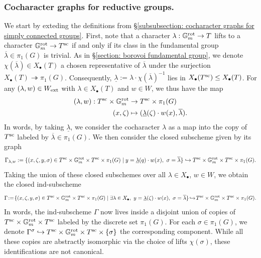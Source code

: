 \subsubsection{Cocharacter graphs for reductive groups.}\label{subsubsection: cocharacter graphs for reductive groups}
We start by exteding the definitions from \S \ref{subsubsection: cocharacter graphs for simply connected groups}.
First, note that a character $\lambda: \Gm^{\rot} \to T$ lifts to a character $\Gm^{\rot} \to T^{\sc}$ if and only if its class in the fundamental group $\overline{\lambda} \in \pi_1(G)$ is trivial. As in \S \ref{section: borovoi fundamental group}, we denote $\chi(\overline{\lambda}) \in X_{\bullet}(T)$ a chosen representative of $\overline{\lambda}$ under the surjection $X_{\bullet}(T) \twoheadrightarrow \pi_1(G)$. Consequently, $\underline{\lambda} := \lambda \cdot \chi(\overline{\lambda})^{-1}$ lies in $X_{\bullet}(T^{\sc}) \leq X_{\bullet}(T)$.
%
For any $(\lambda, w) \in W_{\ext}$ with $\lambda \in X_{\bullet}(T)$ and $w \in W$, we thus have the map
\begin{align*}
    (\lambda, w): T^{\sc} \times \Gm^{\rot} &\to T^{\sc} \times \pi_1(G) \\
    (x, \zeta) &\mapsto (\underline{\lambda}(\zeta) \cdot w(x), \overline{\lambda}).
\end{align*}
In words, by taking $\underline{\lambda}$, we consider the cocharacter $\lambda$ as a map into the copy of $T^{\sc}$ labeled by $\overline{\lambda} \in \pi_1(G)$. We then consider the closed subscheme given by its graph
\begin{equation*}
    \Gamma_{\lambda, w} := \{ (x, \zeta, y, \sigma) \in T^{\sc} \times \Gm^{\rot} \times T^{\sc} \times \pi_1(G) \mid y = \underline{\lambda}(q) \cdot w(x), \ \sigma = \overline{\lambda} \} \hookrightarrow T^{\sc} \times \Gm^{\rot} \times T^{\sc} \times \pi_1(G).
\end{equation*}
%
Taking the union of these closed subschemes over all $\lambda \in X_{\bullet}$, $w \in W$, we obtain the closed ind-subscheme
\begin{equation*}
    \Gamma \! := \! \{ (x, \zeta, y, \sigma) \in T^{\sc} \times \Gm^{\rot} \times T^{\sc} \times \pi_1(G) \mid \exists \lambda \in X_{\bullet}, \ y = \underline{\lambda}(\zeta)\cdot w(x), \ \sigma = \overline{\lambda} \} \! \hookrightarrow \! T^{\sc} \times \Gm^{\rot} \times T^{\sc} \times \pi_1(G).
\end{equation*}
In words, the ind-subscheme $\Gamma$ now lives inside a disjoint union of copies of $T^{\sc} \times \Gm^{\rot} \times T^{\sc}$ labeled by the discrete set $\pi_1(G)$. For each $\sigma \in \pi_1(G)$, we denote $\Gamma^{\sigma} \hookrightarrow T^{\sc} \times \Gm^{\rot} \times T^{\sc} \times \{\sigma\}$ the corresponding component. While all these copies are abstractly isomorphic via the choice of lifts $\chi(\sigma)$, these identifications are not canonical. 


